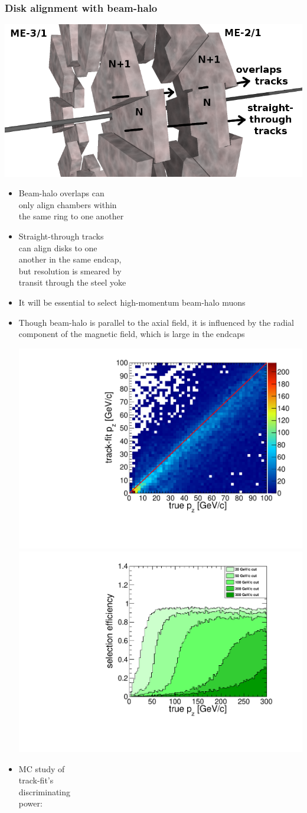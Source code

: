 \documentclass[compress]{beamer}
\begin{document}
\begin{frame}
\frametitle{Disk alignment with beam-halo}

\vspace{-0.3 cm}
\hfill \includegraphics[height=3 cm]{overlaps_straight_through.png}

\vspace{-3.5 cm}
\begin{itemize}
\item Beam-halo overlaps can \\ only align chambers within \\ the same ring
  to one another

\item Straight-through tracks \\ can align disks to one \\ another in the
  same endcap, \\ but resolution is smeared by \\ transit through the steel yoke

\item It will be essential to select high-momentum beam-halo muons

\item Though beam-halo is parallel to the axial field, it is
  influenced by the radial component of the magnetic field, which is
  large in the endcaps

\hfill \includegraphics[height=3 cm]{trackfit_resolution.pdf}
\hspace{0.1 cm} \includegraphics[height=3 cm]{trackfit_turnon.pdf}

\vspace{-3.3 cm}
\item MC study of \\ track-fit's \\ discriminating \\ power:
\end{itemize}
\end{frame}
\end{document}
